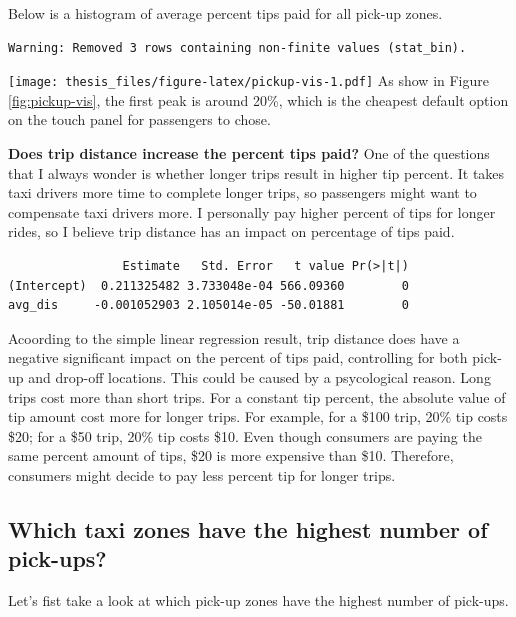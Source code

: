 \documentclass[12pt,twoside]{reedthesis}
\theoremstyle{definition}
\theoremstyle{definition}
\theoremstyle{definition}
\theoremstyle{remark}
\begin{document}
Below is a histogram of average percent tips paid for all pick-up zones.
\begin{verbatim}
Warning: Removed 3 rows containing non-finite values (stat_bin).
\end{verbatim}
\texttt{[image: thesis\_files/figure-latex/pickup-vis-1.pdf]} As show in
Figure \ref{fig:pickup-vis}, the first peak is around 20\%, which is the
cheapest default option on the touch panel for passengers to chose.

\textbf{Does trip distance increase the percent tips paid?} One of the
questions that I always wonder is whether longer trips result in higher
tip percent. It takes taxi drivers more time to complete longer trips,
so passengers might want to compensate taxi drivers more. I personally
pay higher percent of tips for longer rides, so I believe trip distance
has an impact on percentage of tips paid.
\begin{verbatim}
                Estimate   Std. Error   t value Pr(>|t|)
(Intercept)  0.211325482 3.733048e-04 566.09360        0
avg_dis     -0.001052903 2.105014e-05 -50.01881        0
\end{verbatim}
Acoording to the simple linear regression result, trip distance does
have a negative significant impact on the percent of tips paid,
controlling for both pick-up and drop-off locations. This could be
caused by a psycological reason. Long trips cost more than short trips.
For a constant tip percent, the absolute value of tip amount cost more
for longer trips. For example, for a \$100 trip, 20\% tip costs \$20;
for a \$50 trip, 20\% tip costs \$10. Even though consumers are paying
the same percent amount of tips, \$20 is more expensive than \$10.
Therefore, consumers might decide to pay less percent tip for longer
trips.

\subsection{Which taxi zones have the highest number of
pick-ups?}\label{which-taxi-zones-have-the-highest-number-of-pick-ups}

Let's fist take a look at which pick-up zones have the highest number of
pick-ups.
\end{document}

